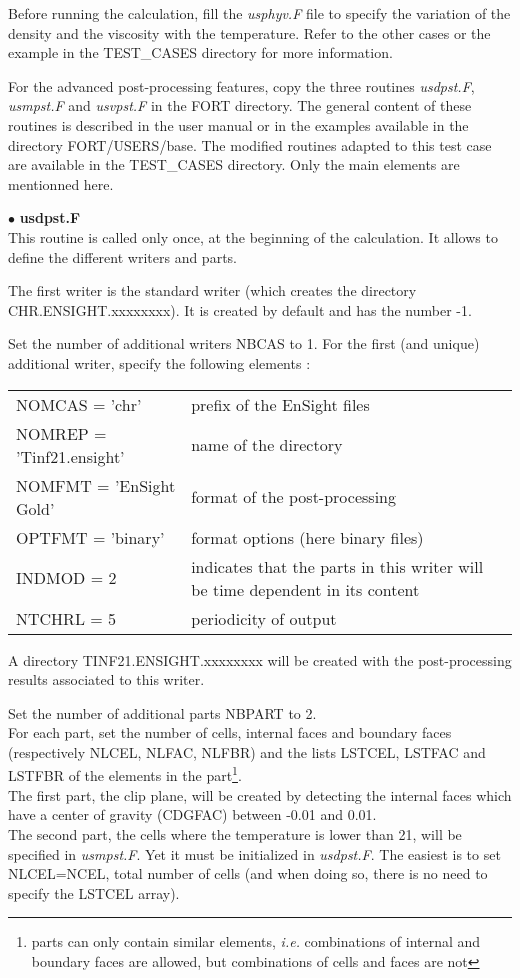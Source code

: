 \newpage
Before running the calculation, fill the {\itshape usphyv.F} file to specify the
variation of the density and the viscosity with the temperature. Refer to the
other cases or the example in the TEST\_CASES directory for more
information.

For the advanced post-processing features, copy the three routines
{\itshape usdpst.F}, {\itshape usmpst.F} and {\itshape usvpst.F} in the FORT
directory. The general content of these routines is described in the user manual
or in the examples available in the directory FORT/USERS/base. The modified
routines adapted to this test case are available in the TEST\_CASES
directory. Only the main elements are mentionned here.



$\bullet$ {\bfseries usdpst.F}\\
This routine is called only once, at the beginning of the calculation. It allows
to define the different writers and parts.

The first writer is the standard writer (which creates the directory
CHR.ENSIGHT.xxxxxxxx). It is created by default and has the number -1.

Set the number of additional writers NBCAS to 1. For the first (and unique)
additional writer, specify the following elements :\\
\begin{tabular}{@{$\bullet\ $}l@{$\quad$}p{10cm}}
NOMCAS = 'chr' & prefix of the EnSight files\\
NOMREP = 'Tinf21.ensight' & name of the directory\\
NOMFMT = 'EnSight Gold' & format of the post-processing\\
OPTFMT = 'binary' & format options (here binary files)\\
INDMOD = 2 & indicates that the parts in this writer will be time dependent in its content\\
NTCHRL = 5 & periodicity of output\\
\end{tabular}
A directory TINF21.ENSIGHT.xxxxxxxx will be created with the post-processing
results associated to this writer.

Set the number of additional parts NBPART to 2.\\
For each part, set the number of cells, internal faces and boundary faces
(respectively NLCEL, NLFAC, NLFBR) and the lists LSTCEL, LSTFAC and LSTFBR of
the elements in the part\footnote{parts can only contain similar elements,
{\em i.e.} combinations of internal and boundary faces are allowed, but
combinations of cells and faces are not}.\\
The first part, the clip plane, will be created by detecting the internal faces
which have a center of gravity (CDGFAC) between -0.01 and 0.01.\\
The second part, the cells where the temperature is lower than 21\degresC, will
be specified in {\itshape usmpst.F}. Yet it must be initialized in
{\itshape usdpst.F}. The easiest is to set \mbox{NLCEL=NCEL}, total number of
cells (and when doing so, there is no need to specify the LSTCEL array).

